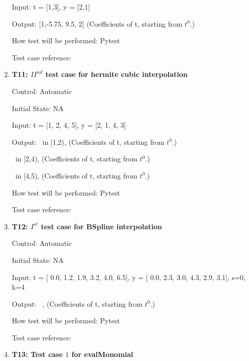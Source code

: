 \documentclass[12pt, titlepage]{article}
\begin{document}
\begin{enumerate}
Input: t = [1,3], y = [2,1]

Output: [1,-5.75, 9.5, 2] (Coefficients of t, starting from $t^{0}$.)


How test will be performed: Pytest

Test case reference: \cite{HermiteCubic} \\

\item{\textbf{T11: ${II}^{nd}$ test case for hermite  cubic interpolation} \\}

Control: Automatic 

Initial State: NA

Input: t = [1, 2, 4, 5], y = [2, 1, 4, 3]

Output: 
~\newline [1.0,1.0, 1.38888889, 2.0] in [1,2), (Coefficients of t, starting from $t^{0}$.)

~\newline [4.0, 4.0, 1.0, 1.0] in [2,4), (Coefficients of t, starting from $t^{0}$.)

~\newline[3.0, 3.61111111, 4.0, 4.0] in [4,5), (Coefficients of t, starting from $t^{0}$.)

How test will be performed: Pytest

Test case reference: \cite{HermiteCubic2}\\

\item{\textbf{T12: $I^{st}$ test case for BSpline interpolation} \\}

Control: Automatic 

Initial State: NA

Input: t = [ 0.0, 1.2,  1.9,  3.2,  4.0,  6.5], y = [ 0.0,  2.3,  3.0,  4.3,  2.9,  3.1], s=0, k=4


Output: 
~\newline [-5.62048630e-18, 2.98780300e+00, -5.74472095e-01,  1.46700914e+01,
-1.03253068e+01,  3.10000000e+00,  0.00000000e+00,  0.00000000e+00,
0.00000000e+00,  0.00000000e+00,  0.00000000e+00], (Coefficients of t, starting from $t^{0}$.)

How test will be performed: Pytest

Test case reference: \cite{BSpline}



\item{\textbf{T13: Test case $1$ for evalMonomial}}


\end{enumerate}
\end{document}
